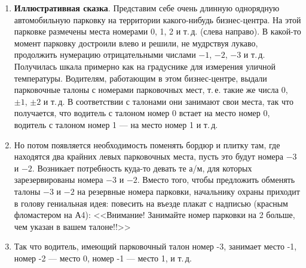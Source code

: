 \begin{enumerate}
\item \textbf{Иллюстративная сказка}. Представим себе очень длинную однорядную автомобильную парковку на территории какого-нибудь бизнес-центра. На этой парковке размечены места номерами 0, 1, 2 и т.\,д. (слева направо). В какой-то момент парковку достроили влево и решили, не мудрствуя лукаво, продолжить нумерацию отрицательными числами $-1$, $-2$, $-3$ и т.\,д. Получилась шкала примерно как на градуснике для измерения уличной температуры. Водителям, работающим в этом бизнес-центре, выдали парковочные талоны с номерами парковочных мест, т.\,е. такие же числа 0, $\pm 1$, $\pm 2$ и т.\,д. В соответствии с талонами они занимают свои места, так что получается, что водитель с талоном номер 0 встает на место номер 0, водитель с талоном номер 1 --- на место номер 1 и т.\,д.
\item Но потом появляется необходимость поменять бордюр и плитку там, где находятся два крайних левых парковочных места, пусть это будут номера $-3$ и $-2$. Возникает потребность куда-то девать те а/м, для которых зарезервированы номера $-3$ и $-2$. Вместо того, чтобы предложить обменять талоны $-3$ и $-2$ на резервные номера парковки, начальнику охраны приходит в голову гениальная идея: повесить на въезде плакат с надписью (красным фломастером на А4): <<Внимание! Занимайте номер парковки на 2 больше, чем указан в вашем талоне!!>>
\item Так что водитель, имеющий парковочный талон номер -3, занимает место -1, номер -2 --- место 0, номер -1 --- место 1, и т.\,д.


\end{enumerate}
